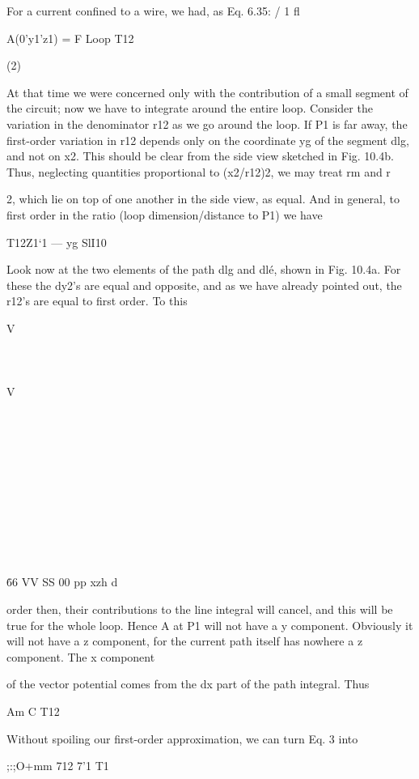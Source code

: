 {For a current confined to a wire, we had, as Eq. 6.35:
/
1 fl

A(0'y1'z1) = F Loop T12

(2)

At that time we were concerned only with the contribution of a small
segment of the circuit; now we have to integrate around the entire
loop. Consider the variation in the denominator r12 as we go around
the loop. If P1 is far away, the first-order variation in r12 depends
only on the coordinate yg of the segment dlg, and not on x2. This
should be clear from the side view sketched in Fig. 10.4b. Thus,
neglecting quantities proportional to (x2/r12)2, we may treat rm
and r{2, which lie on top of one another in the side view, as equal.
And in general, to first order in the ratio (loop dimension/distance
to P1) we have

T12Z1‘1  ---  yg SlI10 

Look now at the two elements of the path dlg and dlé, shown in
Fig. 10.4a. For these the dy2's are equal and opposite, and as we
have already pointed out, the r12's are equal to first order. To this

V\\\\\\\\\§
V\\\\\\\\\\\\\\\\\\\\\\\\\.

66
VV
SS
00
pp
xzh
d

order then, their contributions to the line integral will cancel, and
this will be true for the whole loop. Hence A at P1 will not have a
y component. Obviously it will not have a z component, for the
current path itself has nowhere a z component. The x component

of the vector potential comes from the dx part of the path integral.
Thus

Am%
C T12

Without spoiling our first-order approximation, we can turn Eq. 3
into

;:;O+mm%
712 7'1 T1

}}
